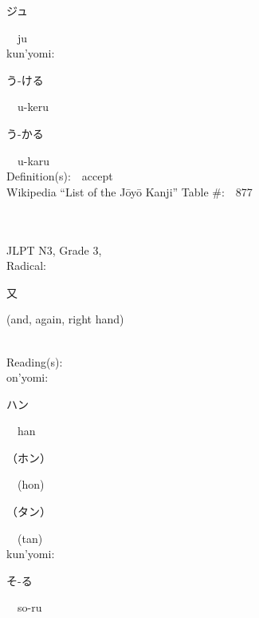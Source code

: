 \begin{multicols}{2}
{\hspace*{2em}}{\begin{CJK}{UTF8}{min} ジュ \end{CJK}}\ \ ju\ \ \\
{\hspace*{1em}}kun'yomi:\ \ \\
{\hspace*{2em}}{\begin{CJK}{UTF8}{min} う-ける \end{CJK}}\ \ u-keru\ \ \\
{\hspace*{2em}}{\begin{CJK}{UTF8}{min} う-かる \end{CJK}}\ \ u-karu\ \ \\
Definition(s):\ \ accept \\
Wikipedia ``List of the J\=oy\=o Kanji'' Table \#:\ \ 877 \\
\ \ \\
{\fontsize{34pt}{40pt}  }\ \ \\  %
{JLPT N3, Grade 3, \\Radical:\ \ {\begin{CJK}{UTF8}{min} 又 \end{CJK}} (and, again, right hand) } \\
Reading(s):\ \ \\
{\hspace*{1em}}on'yomi:\ \ \\
{\hspace*{2em}}{\begin{CJK}{UTF8}{min} ハン \end{CJK}}\ \ han\ \ \\
{\hspace*{2em}}{\begin{CJK}{UTF8}{min} （ホン） \end{CJK}}\ \ (hon)\ \ \\
{\hspace*{2em}}{\begin{CJK}{UTF8}{min} （タン） \end{CJK}}\ \ (tan)\ \ \\
{\hspace*{1em}}kun'yomi:\ \ \\
{\hspace*{2em}}{\begin{CJK}{UTF8}{min} そ-る \end{CJK}}\ \ so-ru\ \ \\

\end{multicols}
